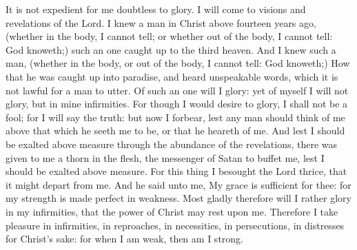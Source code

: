  It is not expedient for me doubtless to glory. I will come
to visions and revelations of the Lord.  I knew a man in
Christ above fourteen years ago, (whether in the body, I cannot tell; or
whether out of the body, I cannot tell: God knoweth;) such an one caught
up to the third heaven.  And I knew such a man, (whether in
the body, or out of the body, I cannot tell: God knoweth;) 
How that he was caught up into paradise, and heard unspeakable words,
which it is not lawful for a man to utter.  Of such an one
will I glory: yet of myself I will not glory, but in mine infirmities.
 For though I would desire to glory, I shall not be a fool;
for I will say the truth: but now I forbear, lest any man should think
of me above that which he seeth me to be, or that he heareth of me.
 And lest I should be exalted above measure through the
abundance of the revelations, there was given to me a thorn in the
flesh, the messenger of Satan to buffet me, lest I should be exalted
above measure.  For this thing I besought the Lord thrice,
that it might depart from me.  And he said unto me, My grace
is sufficient for thee: for my strength is made perfect in weakness.
Most gladly therefore will I rather glory in my infirmities, that the
power of Christ may rest upon me.  Therefore I take
pleasure in infirmities, in reproaches, in necessities, in persecutions,
in distresses for Christ's sake: for when I am weak, then am I strong.

